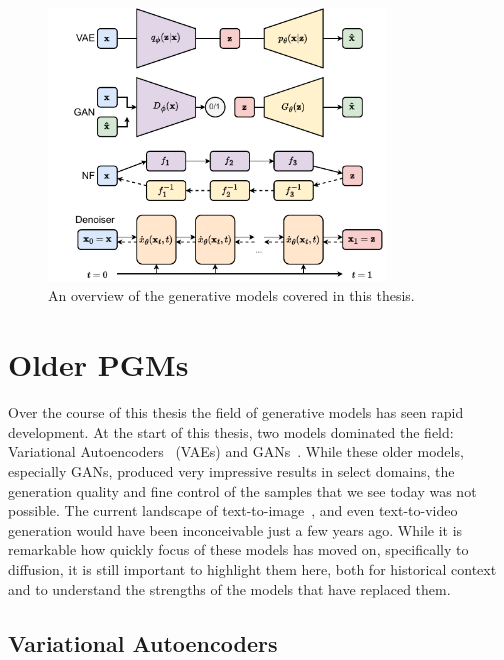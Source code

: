 \begin{figure}[ht]
    \centering
    \includegraphics[width=0.8\textwidth]{Figures/transformers/pgms.pdf}
    \caption{An overview of the generative models covered in this thesis.}
    \label{fig:generative_models}
\end{figure}


\section{Older PGMs}

Over the course of this thesis the field of generative models has seen rapid development.
At the start of this thesis, two models dominated the field: Variational Autoencoders~\cite{AutoEncodingVariationalBayes} (VAEs) and GANs~\cite{GenerativeAdversarialNetworks}.
While these older models, especially GANs, produced very impressive results in select domains, the generation quality and fine control of the samples that we see today was not possible.
The current landscape of text-to-image~\cite{Imagen, Dalle, SD3}, and even text-to-video~\cite{ImagenVideo} generation would have been inconceivable just a few years ago.
While it is remarkable how quickly focus of these models has moved on, specifically to diffusion, it is still important to highlight them here, both for historical context and to understand the strengths of the models that have replaced them.

\subsection{Variational Autoencoders}


